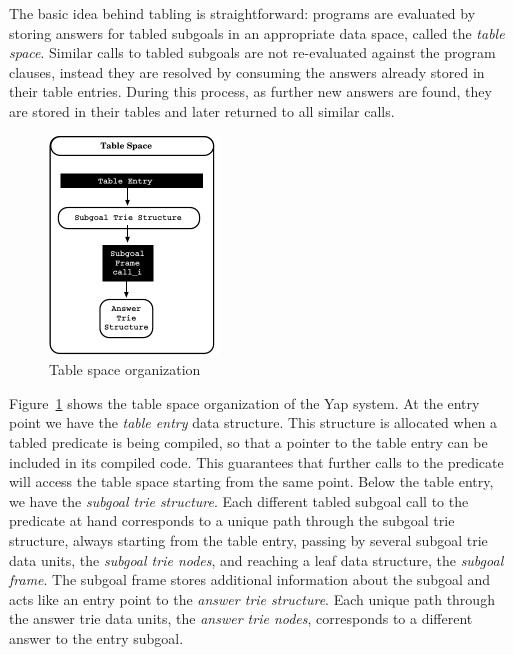 \documentclass{llncs}
\begin{document}
The basic idea behind tabling is straightforward: programs are
evaluated by storing answers for tabled subgoals in an appropriate
data space, called the \emph{table space}. Similar calls to tabled
subgoals are not re-evaluated against the program clauses, instead
they are resolved by consuming the answers already stored in their
table entries. During this process, as further new answers are found,
they are stored in their tables and later returned to all similar
calls.

\begin{figure}
\vspace{-\intextsep}
\centering
\includegraphics[width=4.5cm]{figures/table-space.pdf}
\caption{Table space organization}
\label{fig_table_space}
\vspace{-0.5\intextsep}
\end{figure}

Figure~\ref{fig_table_space} shows the table space organization of the
Yap system. At the entry point we have the \emph{table entry} data
structure. This structure is allocated when a tabled predicate is
being compiled, so that a pointer to the table entry can be included
in its compiled code. This guarantees that further calls to the
predicate will access the table space starting from the same
point. Below the table entry, we have the \emph{subgoal trie
  structure}. Each different tabled subgoal call to the predicate at
hand corresponds to a unique path through the subgoal trie structure,
always starting from the table entry, passing by several subgoal trie
data units, the \emph{subgoal trie nodes}, and reaching a leaf data
structure, the \emph{subgoal frame}. The subgoal frame stores
additional information about the subgoal and acts like an entry point
to the \emph{answer trie structure}. Each unique path through the
answer trie data units, the \emph{answer trie nodes}, corresponds to a
different answer to the entry subgoal.

\end{document}
